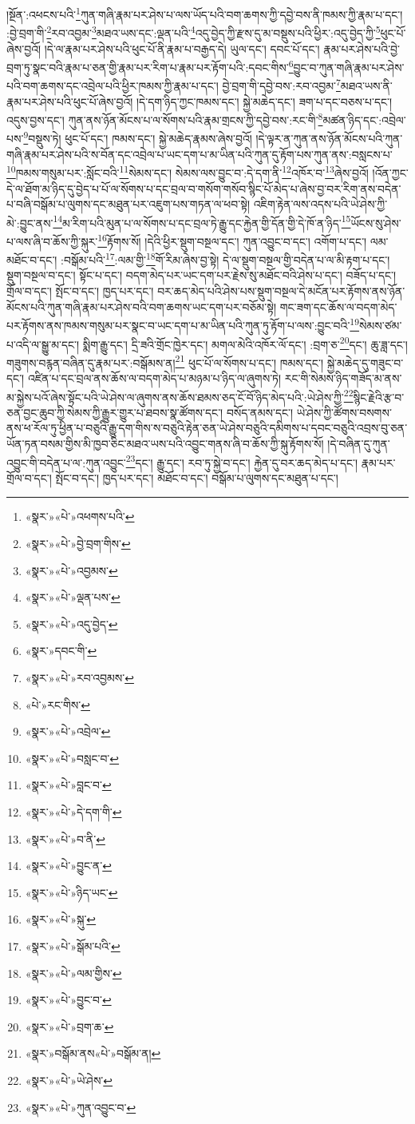 །སྔོན་:འཕངས་པའི་\footnote{«སྣར་»«པེ་»འཕགས་པའི་}ཀུན་གཞི་རྣམ་པར་ཤེས་པ་ལས་ཡོད་པའི་བག་ཆགས་ཀྱི་དབྱེ་བས་ནི་ཁམས་ཀྱི་རྣམ་པ་དང་། :བྱེ་བྲག་གི་\footnote{«སྣར་»«པེ་»བྱེ་བྲག་གིས་}རབ་འབྱམ་\footnote{«སྣར་»«པེ་»འབྱམས་}མཐའ་ཡས་དང་:ལྡན་པའི་\footnote{«སྣར་»«པེ་»ལྡན་པས་}འདུ་བྱེད་ཀྱི་རྫས་དུ་མ་བསྡུས་པའི་ཕྱིར་:འདུ་བྱེད་ཀྱི་\footnote{«སྣར་»«པེ་»འདུ་བྱེད་}ཕུང་པོ་ཞེས་བྱའོ། །དེ་ལ་རྣམ་པར་ཤེས་པའི་ཕུང་པོ་ནི་རྣམ་པ་བརྒྱད་དེ། ཡུལ་དང་། དབང་པོ་དང་། རྣམ་པར་ཤེས་པའི་བྱེ་བྲག་ཏུ་སྣང་བའི་རྣམ་པ་ཅན་གྱི་རྣམ་པར་རིག་པ་རྣམ་པར་རྟོག་པའི་:དབང་གིས་\footnote{«སྣར་»དབང་གི་}བྱུང་བ་ཀུན་གཞི་རྣམ་པར་ཤེས་པའི་བག་ཆགས་དང་འབྲེལ་པའི་ཕྱིར་ཁམས་ཀྱི་རྣམ་པ་དང་། བྱེ་བྲག་གི་དབྱེ་བས་:རབ་འབྱམ་\footnote{«སྣར་»«པེ་»རབ་འབྱམས་}མཐའ་ཡས་ནི་རྣམ་པར་ཤེས་པའི་ཕུང་པོ་ཞེས་བྱའོ། །དེ་དག་ཉིད་ཀྱང་ཁམས་དང་། སྐྱེ་མཆེད་དང་། ཟག་པ་དང་བཅས་པ་དང་། འདུས་བྱས་དང་། ཀུན་ནས་ཉོན་མོངས་པ་ལ་སོགས་པའི་རྣམ་གྲངས་ཀྱི་དབྱེ་བས་:རང་གི་\footnote{«པེ་»རང་གིས་}མཚན་ཉིད་དང་:འབྲེལ་པས་\footnote{«སྣར་»«པེ་»འབྲེལ་}བསྡུས་ཏེ། ཕུང་པོ་དང་། ཁམས་དང་། སྐྱེ་མཆེད་རྣམས་ཞེས་བྱའོ། །དེ་ལྟར་ན་ཀུན་ནས་ཉོན་མོངས་པའི་ཀུན་གཞི་རྣམ་པར་ཤེས་པའི་ས་བོན་དང་འབྲེལ་པ་ཡང་དག་པ་མ་ཡིན་པའི་ཀུན་དུ་རྟོག་པས་ཀུན་ནས་:བསླངས་པ་\footnote{«སྣར་»«པེ་»བསླང་བ་}ཁམས་གསུམ་པར་:སློང་བའི་\footnote{«སྣར་»«པེ་»བླང་བ་}སེམས་དང་། སེམས་ལས་བྱུང་བ་:དེ་དག་ནི་\footnote{«སྣར་»«པེ་»དེ་དག་གི་}འཁོར་བ་\footnote{«སྣར་»«པེ་»བ་ནི་}ཞེས་བྱའོ། །འོན་ཀྱང་དེ་ལ་ཐོག་མ་ཉིད་དུ་བྱེད་པ་པོ་ལ་སོགས་པ་དང་བྲལ་བ་གསོག་གསོབ་སྙིང་པོ་མེད་པ་ཞེས་བྱ་བར་རིག་ནས་བདེན་པ་བཞི་བསྒོམ་པ་ལུགས་དང་མཐུན་པར་འཇུག་པས་གཏན་ལ་ཕབ་སྟེ། འཇིག་རྟེན་ལས་འདས་པའི་ཡེ་ཤེས་ཀྱི་མེ་:བྱུང་ནས་\footnote{«སྣར་»«པེ་»བྱུང་ན་}མ་རིག་པའི་མུན་པ་ལ་སོགས་པ་དང་བྲལ་ཏེ་རྒྱུ་དང་རྐྱེན་གྱི་དོན་གྱི་དེ་ཁོ་ན་ཉིད་\footnote{«སྣར་»«པེ་»ཉིད་ཡང་}ཡོངས་སུ་ཤེས་པ་ལས་ཞི་བ་ཆོས་ཀྱི་སྐུར་\footnote{«སྣར་»«པེ་»སྐུ་}རྟོགས་སོ། །དེའི་ཕྱིར་སྡུག་བསྔལ་དང་། ཀུན་འབྱུང་བ་དང་། འགོག་པ་དང་། ལམ་མཐོང་བ་དང་། :བསྒོམ་པའི་\footnote{«སྣར་»«པེ་»སྒོམ་པའི་}:ལམ་གྱི་\footnote{«སྣར་»«པེ་»ལམ་གྱིས་}གོ་རིམ་ཞེས་བྱ་སྟེ། དེ་ལ་སྡུག་བསྔལ་གྱི་བདེན་པ་ལ་མི་རྟག་པ་དང་། སྡུག་བསྔལ་བ་དང་། སྟོང་པ་དང་། བདག་མེད་པར་ཡང་དག་པར་རྗེས་སུ་མཐོང་བའི་ཤེས་པ་དང་། བཟོད་པ་དང་། གྲོལ་བ་དང་། སྤོང་བ་དང་། ཁྱད་པར་དང་། བར་ཆད་མེད་པའི་ཤེས་པས་སྡུག་བསྔལ་དེ་མངོན་པར་རྟོགས་ནས་ཉོན་མོངས་པའི་ཀུན་གཞི་རྣམ་པར་ཤེས་བའི་བག་ཆགས་ཡང་དག་པར་བཅོམ་སྟེ། གང་ཟག་དང་ཆོས་ལ་བདག་མེད་པར་རྟོགས་ནས་ཁམས་གསུམ་པར་སྣང་བ་ཡང་དག་པ་མ་ཡིན་པའི་ཀུན་ཏུ་རྟོག་པ་ལས་:བྱུང་བའི་\footnote{«སྣར་»«པེ་»བྱུང་བ་}སེམས་ཙམ་པ་འདི་ལ་སྒྱུ་མ་དང་། སྨིག་རྒྱུ་དང་། དྲི་ཟའི་གྲོང་ཁྱེར་དང་། མགལ་མེའི་འཁོར་ལོ་དང་། :བྲག་ཅ་\footnote{«སྣར་»«པེ་»བྲག་ཆ་}དང་། ཆུ་ཟླ་དང་། གཟུགས་བརྙན་བཞིན་དུ་རྣམ་པར་:བསྒོམས་ན།\footnote{«སྣར་»བསྒོམ་ནས«པེ་»བསྒོམ་ན།} ཕུང་པོ་ལ་སོགས་པ་དང་། ཁམས་དང་། སྐྱེ་མཆེད་དུ་གཟུང་བ་དང་། འཛིན་པ་དང་བྲལ་ནས་ཆོས་ལ་བདག་མེད་པ་མཉམ་པ་ཉིད་ལ་ཞུགས་ཏེ། རང་གི་སེམས་ཉིད་གཟོད་མ་ནས་མ་སྐྱེས་པའོ་ཞེས་སྟོང་པའི་ཡེ་ཤེས་ལ་ཞུགས་ནས་ཆོས་ཐམས་ཅད་ངོ་བོ་ཉིད་མེད་པའི་:ཡེ་ཤེས་ཀྱི་\footnote{«སྣར་»«པེ་»ཡེ་ཤེས་}སྙིང་རྗེའི་རྩ་བ་ཅན་བྱང་ཆུབ་ཀྱི་སེམས་ཀྱི་རྒྱུར་གྱུར་པ་ཐབས་སྣ་ཚོགས་དང་། བསོད་ནམས་དང་། ཡེ་ཤེས་ཀྱི་ཚོགས་བསགས་ནས་ཕ་རོལ་ཏུ་ཕྱིན་པ་བཅུའི་རྒྱུ་དག་གིས་ས་བཅུའི་རྟེན་ཅན་ཡེ་ཤེས་བཅུའི་དམིགས་པ་དབང་བཅུའི་འབྲས་བུ་ཅན་ཡོན་ཏན་བསམ་གྱིས་མི་ཁྱབ་ཅིང་མཐའ་ཡས་པའི་འབྱུང་གནས་ཞི་བ་ཆོས་ཀྱི་སྐུ་རྟོགས་སོ། །དེ་བཞིན་དུ་ཀུན་འབྱུང་གི་བདེན་པ་ལ་:ཀུན་འབྱུང་\footnote{«སྣར་»«པེ་»ཀུན་འབྱུང་བ་}དང་། རྒྱུ་དང་། རབ་ཏུ་སྐྱེ་བ་དང་། རྐྱེན་དུ་བར་ཆད་མེད་པ་དང་། རྣམ་པར་གྲོལ་བ་དང་། སྤོང་བ་དང་། ཁྱད་པར་དང་། མཐོང་བ་དང་། བསྒོམ་པ་ལུགས་དང་མཐུན་པ་དང་། 